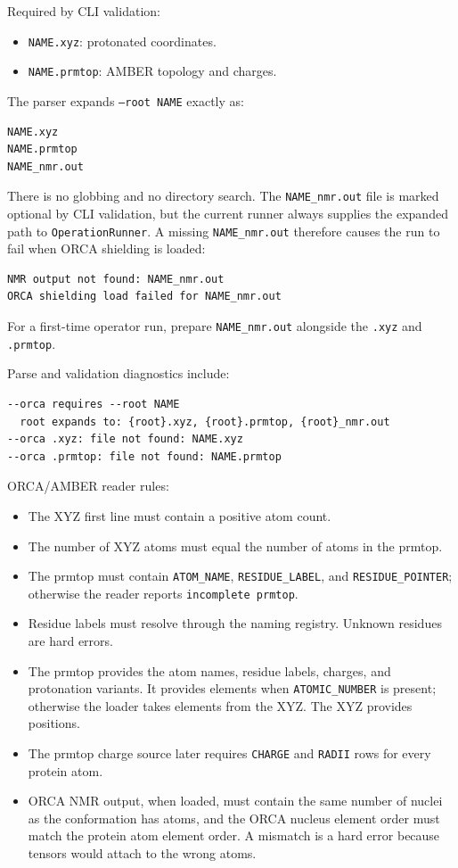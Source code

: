 \documentclass[11pt]{article}
\begin{document}
Required by CLI validation:

\begin{itemize}
\item \texttt{NAME.xyz}: protonated coordinates.
\item \texttt{NAME.prmtop}: AMBER topology and charges.
\end{itemize}

The parser expands \texttt{--root NAME} exactly as:

\begin{lstlisting}
NAME.xyz
NAME.prmtop
NAME_nmr.out
\end{lstlisting}

There is no globbing and no directory search. The \texttt{NAME\_nmr.out} file
is marked optional by CLI validation, but the current runner always supplies
the expanded path to \texttt{OperationRunner}. A missing
\texttt{NAME\_nmr.out} therefore causes the run to fail when ORCA shielding is
loaded:

\begin{lstlisting}
NMR output not found: NAME_nmr.out
ORCA shielding load failed for NAME_nmr.out
\end{lstlisting}

For a first-time operator run, prepare \texttt{NAME\_nmr.out} alongside the
\texttt{.xyz} and \texttt{.prmtop}.

Parse and validation diagnostics include:

\begin{lstlisting}
--orca requires --root NAME
  root expands to: {root}.xyz, {root}.prmtop, {root}_nmr.out
--orca .xyz: file not found: NAME.xyz
--orca .prmtop: file not found: NAME.prmtop
\end{lstlisting}

ORCA/AMBER reader rules:

\begin{itemize}
\item The XYZ first line must contain a positive atom count.
\item The number of XYZ atoms must equal the number of atoms in the prmtop.
\item The prmtop must contain \texttt{ATOM\_NAME}, \texttt{RESIDUE\_LABEL},
  and \texttt{RESIDUE\_POINTER}; otherwise the reader reports
  \texttt{incomplete prmtop}.
\item Residue labels must resolve through the naming registry. Unknown
  residues are hard errors.
\item The prmtop provides the atom names, residue labels, charges, and
  protonation variants. It provides elements when \texttt{ATOMIC\_NUMBER}
  is present; otherwise the loader takes elements from the XYZ. The XYZ
  provides positions.
\item The prmtop charge source later requires \texttt{CHARGE} and
  \texttt{RADII} rows for every protein atom.
\item ORCA NMR output, when loaded, must contain the same number of nuclei as
  the conformation has atoms, and the ORCA nucleus element order must match
  the protein atom element order. A mismatch is a hard error because tensors
  would attach to the wrong atoms.
\end{itemize}
\end{document}

